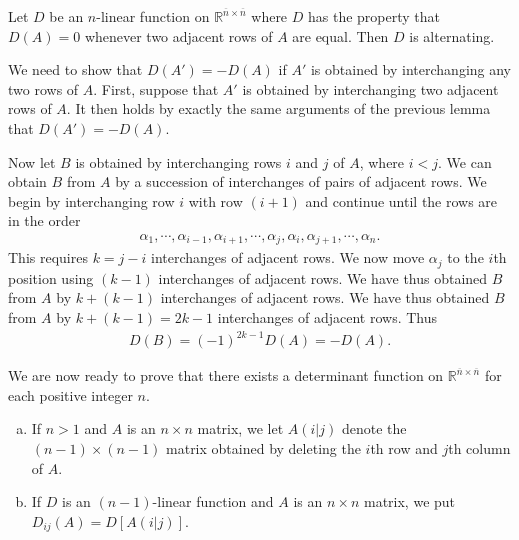 \documentclass[12pt,letterpaper,reqno]{article}
\numberwithin{equation}{section}
\newcommand{\fixme}[1]{{\color{orange}{[#1]}}}
\begin{document}
\begin{lem}[$D(A)=0$ implies alternating for $n$-linear functions]\label{lem:d_a_0_implies_alternating}
	Let $D$ be an $n$-linear function on $\mathbb{R}^{\overline{n} \times \overline{n}}$ where $D$ has the property that $D(A)=0$ whenever two adjacent rows of $A$ are equal. Then $D$ is alternating.
\end{lem}

\begin{pf}
We need to show that $D(A')=-D(A)$ if $A'$ is obtained by interchanging any two rows of $A$. First, suppose that $A'$ is obtained by interchanging two adjacent rows of $A$. It then holds by exactly the same arguments of the previous lemma that $D(A')=-D(A)$.

Now let $B$ is obtained by interchanging rows $i$ and $j$ of $A$, where $i<j$. We can obtain $B$ from $A$ by a succession of interchanges of pairs of adjacent rows. We begin by interchanging row $i$ with row $(i+1)$ and continue until the rows are in the order
\begin{align*}
	\alpha_1,\cdots,\alpha_{i-1},\alpha_{i+1},\cdots,\alpha_j,\alpha_i,\alpha_{j+1},\cdots,\alpha_n.
\end{align*}
This requires $k=j-i$ interchanges of adjacent rows. We now move $\alpha_j$ to the $i$th position using $(k-1)$ interchanges of adjacent rows. We have thus obtained $B$ from $A$ by $k+(k-1)$ interchanges of adjacent rows. We have thus obtained $B$ from $A$ by $k+(k-1)=2k-1$ interchanges of adjacent rows. Thus
\begin{align*}
	D(B)=(-1)^{2k-1}D(A)=-D(A).
\end{align*}	
\end{pf}

We are now ready to prove that there exists a determinant function on $\mathbb{R}^{\overline{n} \times \overline{n}}$ for each positive integer $n$. 

\begin{defn}[\fixme{Need label.}]
\begin{enumerate}[(a)] \hspace{10cm}
	\item If $n>1$ and $A$ is an $n \times n$ matrix, we let $A(i\vert j)$ denote the $(n-1) \times (n-1)$ matrix obtained by deleting the $i$th row and $j$th column of $A$.
	\item If $D$ is an $(n-1)$-linear function and $A$ is an $n \times n$ matrix, we put $D_{ij}(A)=D[A(i \vert j)]$.
\end{enumerate}
\end{defn}
\end{document}
